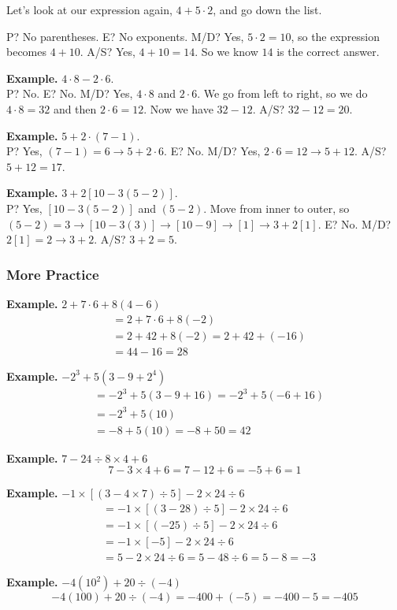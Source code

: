 \documentclass[letter]{article}
\begin{document}
Let's look at our expression again, $4+5\cdot2$, and go down the list.

P? No parentheses. \quad E? No exponents. \quad M/D? Yes, $5\cdot2=10$, so the expression becomes $4+10$. \quad A/S? Yes, $4+10=14$. So we know $14$ is the correct answer.

\textbf{Example.} $4\cdot8-2\cdot6$.\\
P? No. E? No. M/D? Yes, $4\cdot8$ and $2\cdot6$. We go from left to right, so we do $4\cdot8=32$ and then $2\cdot6=12$. Now we have $32-12$. A/S? $32-12=20$.

\textbf{Example.} $5+2\cdot(7-1)$.\\
P? Yes, $(7-1)=6\to5+2\cdot6$. E? No. M/D? Yes, $2\cdot6=12\to5+12$. A/S? $5+12=17$.

\textbf{Example.} $3+2[10-3(5-2)]$.\\
P? Yes, $[10-3(5-2)]$ and $(5-2)$. Move from inner to outer, so $(5-2)=3\to[10-3(3)]\to[10-9]\to[1]\to3+2[1]$. E? No. M/D? $2[1]=2\to3+2$. A/S? $3+2=5$.

\subsubsection*{More Practice}

\textbf{Example.} $2+7\cdot6+8(4-6)$
\begin{align*}
  &=2+7\cdot6+8(-2)\\
  &=2+42+8(-2)=2+42+(-16)\\
  &=44-16=28
\end{align*}

\textbf{Example.} $-2^3+5(3-9+2^4)$
\begin{align*}
  &=-2^3+5(3-9+16)=-2^3+5(-6+16)\\
  &=-2^3+5(10)\\
  &=-8+5(10)=-8+50=42
\end{align*}

\textbf{Example.} $7-24\div8\times4+6$
\[7-3\times4+6=7-12+6=-5+6=1\]

\textbf{Example.} $-1\times[(3-4\times7)\div5]-2\times24\div6$
\begin{align*}
  &=-1\times[(3-28)\div5]-2\times24\div6\\
  &=-1\times[(-25)\div5]-2\times24\div6\\
  &=-1\times[-5]-2\times24\div6\\
  &=5-2\times24\div6=5-48\div6=5-8=-3
\end{align*}

\textbf{Example.} $-4(10^2)+20\div(-4)$
\[-4(100)+20\div(-4)=-400+(-5)=-400-5=-405\]
\end{document}
